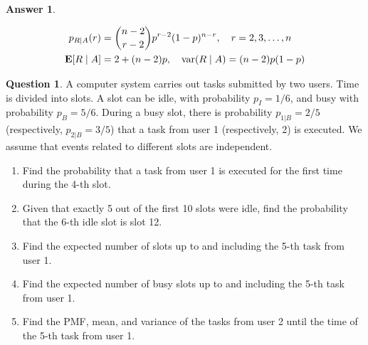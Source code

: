 \documentclass[utf8]{article}
\theoremstyle{definition}%
\newtheorem{question}{Question} %
\theoremstyle{plain}%
\newtheorem{answer}{Answer} %
\begin{document}
\begin{answer}
\begin{enumerate}[label=(\alph*)]
        \begin{equation}
        \begin{aligned}
            p_{R \mid A}(r) &= \binom{n - 2}{r - 2} p^{r - 2} (1 - p)^{n - r}, \quad r = 2, 3, \ldots, n \\ 
            \mathbf{E}[R \mid A] &= 2 + (n - 2)p, \quad \mathrm{var}(R \mid A) = (n - 2)p(1 - p)
        \end{aligned}
        \end{equation}
    \end{enumerate}
\end{answer}

\begin{question}
    A computer system carries out tasks submitted by two users. Time is divided into slots. A slot can be idle, with probability $p_I = 1/6$, and busy with probability $p_B = 5/6$. During a busy slot, there is probability $p_{1|B} = 2/5$ (respectively, $p_{2|B} = 3/5$) that a task from user 1 (respectively, 2) is executed. We assume that events related to different slots are independent.
    \begin{enumerate}[label=(\alph*)]
        \item Find the probability that a task from user 1 is executed for the first time during the 4-th slot.
        \item Given that exactly 5 out of the first 10 slots were idle, find the probability that the 6-th idle slot is slot 12.
        \item Find the expected number of slots up to and including the 5-th task from user 1.
        \item Find the expected number of busy slots up to and including the 5-th task from user 1.
        \item Find the PMF, mean, and variance of the tasks from user 2 until the time of the 5-th task from user 1.
    \end{enumerate}
\end{question}
\end{document}
